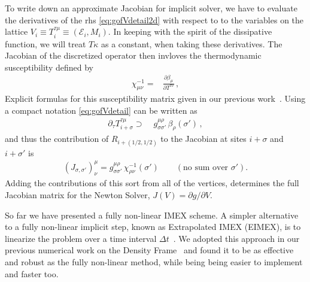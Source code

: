 \documentclass[12pt,aps,preprint,nofootinbib,noshowkeys,noshowpacs,longbibliography,superscriptaddress,tightenlines]{revtex4-2}
\def\edense{{\mathcal{E}}}
\def\pdense{M}
\begin{document}
To write down an approximate Jacobian for implicit solver, we have to evaluate the
derivatives of the rhs \cref{eq:gofVdetail2d} with respect to 
to the variables on the lattice $V_i \equiv T^{\tau \mu}_i \equiv (\edense_i, \pdense_i)$. 
In keeping with the spirit of the dissipative function, we will treat
$T\kappa$ as
a constant, when taking these derivatives.
The Jacobian of the discretized
operator then invloves the 
thermodynamic susceptibility  defined by
\begin{align}
\chi^{-1}_{\mu\nu} =&  \frac{\partial \beta_{\mu}}{\partial T^{\tau \nu}}  \, , 
\end{align}
 Explicit formulas for this susceptibility matrix given in our previous work~\cite{NumericsPaper,TheoryPaper}.
 Using a compact notation  \cref{eq:gofVdetail}  can be written as
\begin{align}
 \partial_\tau T^{\tau \mu}_{i+\sigma}  \supset& \;  g^{\mu\rho}_{\sigma\sigma'}\, \beta_{\rho}(\sigma')  \, , 
\end{align}
and thus the  contribution of $R_{i+(1/2, 1/2)}$ to the Jacobian at sites $i+\sigma$ and $i+ \sigma'$ is 
\begin{align}
 (J_{\sigma, \sigma'})^{\mu}_{\nu} = g^{\mu\rho}_{\sigma\sigma'} \, \chi^{-1}_{\rho\nu}(\sigma')  \qquad (\mbox{no sum over $\sigma'$}). 
\end{align}
Adding the contributions of this sort from all of the vertices,  determines the full Jacobian  matrix for the Newton Solver, $J(V) = \partial g/\partial V$.  




So far we  have presented a fully non-linear IMEX scheme. A simpler
alternative to a fully non-linear implicit step, known as Extrapolated IMEX (EIMEX), is to linearize
the problem over a time interval $\Delta t$~\cite{Constantinescu}.
We adopted this approach in our previous numerical work on the
Density Frame~\cite{NumericsPaper} and found it to be as
effective and robust as the fully non-linear method, while being
being easier to implement and faster too.
\end{document}
